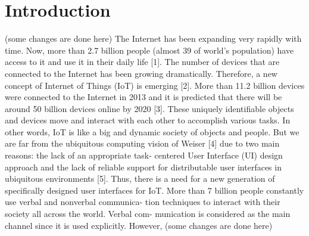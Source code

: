 \documentclass[runningheads,a4paper]{llncs}
\begin{document}
\section{Introduction}
(some changes are done here)
The Internet has been expanding very rapidly with time. Now, more than 2.7 billion people (almost 39 of world’s population) have access to it and use it in their daily life [1]. The number of devices that are connected to the Internet has been growing dramatically. Therefore, a new concept of Internet of Things (IoT) is emerging [2]. More than 11.2 billion devices were connected to the Internet in 2013 and it is predicted that there will be around 50 billion devices online by 2020 [3]. These uniquely identifiable objects and devices move and interact with each other to accomplish various tasks. In other words, IoT is like a big and dynamic society of objects and people. But we are far from the ubiquitous computing vision of Weiser [4] due to two main reasons: the lack of an appropriate task- centered User Interface (UI) design approach and the lack of reliable support for distributable user interfaces in ubiquitous environments [5]. Thus, there is a need for a new generation of specifically designed user interfaces for IoT.
\newline
More than 7 billion people constantly use verbal and nonverbal communica- tion techniques to interact with their society all across the world. Verbal com- munication is considered as the main channel since it is used explicitly. However, 
\newpage
(some changes are done here)
\end{document}
